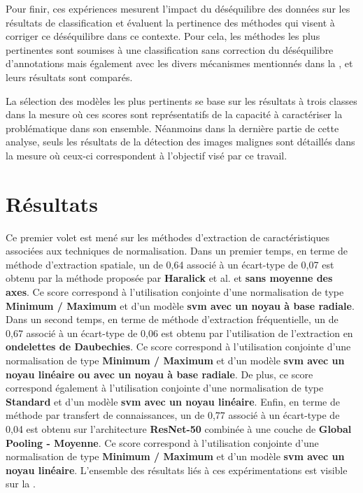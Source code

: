 Pour finir, ces expériences mesurent l'impact du déséquilibre des données sur les résultats de classification et évaluent la pertinence des méthodes qui visent à corriger ce déséquilibre dans ce contexte. Pour cela, les méthodes les plus pertinentes sont soumises à une classification sans correction du déséquilibre d'annotations mais également avec les divers mécanismes mentionnés dans la , et leurs résultats sont comparés.\par

La sélection des modèles les plus pertinents se base sur les résultats à trois classes dans la mesure où ces scores sont représentatifs de la capacité à caractériser la problématique dans son ensemble. Néanmoins dans la dernière partie de cette analyse, seuls les résultats de la détection des images malignes sont détaillés dans la mesure où ceux-ci correspondent à l'objectif visé par ce travail.\par

\addtocounter{footnote}{1}
\clearpage

\section{Résultats}
Ce premier volet est mené sur les méthodes d'extraction de caractéristiques associées aux techniques de normalisation. Dans un premier temps, en terme de méthode d'extraction spatiale, un \fscore{} de 0,64 associé à un écart-type de 0,07 est obtenu par la méthode proposée par \textbf{Haralick} et al. et \textbf{sans moyenne des axes}. Ce score correspond à l'utilisation conjointe d'une normalisation de type \textbf{Minimum / Maximum} et d'un modèle \textbf{\gls{svm} avec un noyau à base radiale}. Dans un second temps, en terme de méthode d'extraction fréquentielle, un \fscore{} de 0,67 associé à un écart-type de 0,06 est obtenu par l'utilisation de l'extraction en \textbf{ondelettes de Daubechies}. Ce score correspond à l'utilisation conjointe d'une normalisation de type \textbf{Minimum / Maximum} et d'un modèle \textbf{\gls{svm} avec un noyau linéaire ou avec un noyau à base radiale}. De plus, ce score correspond également à l'utilisation conjointe d'une normalisation de type \textbf{Standard} et d'un modèle \textbf{\gls{svm} avec un noyau linéaire}. Enfin, en terme de méthode par transfert de connaissances, un \fscore{} de 0,77 associé à un écart-type de 0,04 est obtenu sur l'architecture \textbf{ResNet-50} combinée à une couche de \textbf{Global Pooling - Moyenne}. Ce score correspond à l'utilisation conjointe d'une normalisation de type \textbf{Minimum / Maximum} et d'un modèle \textbf{\gls{svm} avec un noyau linéaire}. L'ensemble des résultats liés à ces expérimentations est visible sur la .\par

